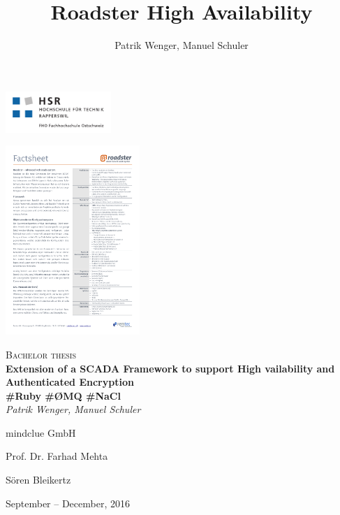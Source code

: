 \documentclass[a4paper]{report}
\title{Roadster High Availability}
\author{Patrik Wenger, Manuel Schuler}
\begin{document}


\thispagestyle{empty}

\begin{titlepage}
\centering
\begin{raggedleft}\includegraphics[trim=10 10 10 10, clip=true, width=0.3\textwidth]{img/hsr_logo.pdf}\end{raggedleft}
\begin{raggedright}\hfill\includegraphics[trim=14.8cm 27cm 1cm 1.4cm, clip=true, width=0.38\textwidth]{img/roadster_factsheet.pdf}\end{raggedright}

\vspace{50mm}
{\scshape\Large Bachelor thesis\\}
\vspace{2cm}
{\huge\bfseries Extension of a SCADA Framework to support High vailability and Authenticated Encryption\\}
\vspace{1cm}
{\huge\bfseries \#Ruby \#\O{}MQ \#NaCl\\}
\vspace{2cm}
{\Large\itshape Patrik Wenger, Manuel Schuler\\}
\vfill
\begin{center}
\begin{varwidth}{\textwidth}
\begin{description}
	\large
	\item [Client:] mindclue GmbH
	\item [Supervisor:] Prof. Dr. Farhad Mehta
	\item [Expert:] S\"oren Bleikertz
\end{description}
\end{varwidth}
\end{center}
\vfill
{\large September -- December, 2016\\}
\end{titlepage}
\end{document}
